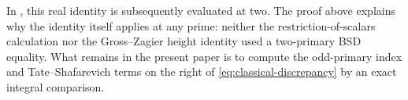 In \cite[Section~2]{B}, this real identity is subsequently evaluated
at two. The proof above explains why the identity itself applies
at any prime: neither the restriction-of-scalars calculation nor
the Gross--Zagier height identity used a two-primary BSD equality.
What remains in the present paper is to compute the odd-primary
index and Tate--Shafarevich terms on the right of
\eqref{eq:classical-discrepancy} by an exact integral comparison.

